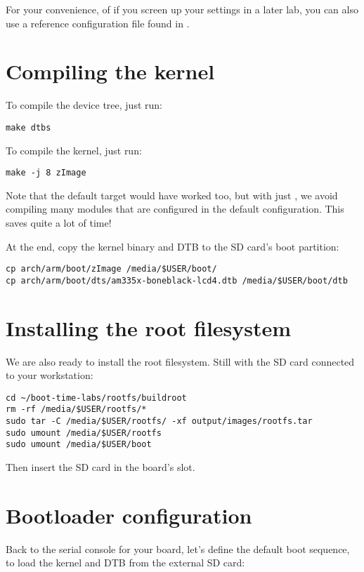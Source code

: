 For your convenience, of if you screen up your settings in a later lab,
you can also use a reference configuration file found in
.

\section{Compiling the kernel}

To compile the device tree, just run:
\begin{verbatim}
make dtbs
\end{verbatim}

To compile the kernel, just run:
\begin{verbatim}
make -j 8 zImage
\end{verbatim}

Note that the default  target would have worked too, but with
just , we avoid compiling many modules that are configured
in the default configuration. This saves quite a lot of time!

At the end, copy the kernel binary and DTB to the SD card's boot
partition:

\begin{verbatim}
cp arch/arm/boot/zImage /media/$USER/boot/
cp arch/arm/boot/dts/am335x-boneblack-lcd4.dtb /media/$USER/boot/dtb
\end{verbatim}

\section{Installing the root filesystem}

We are also ready to install the root filesystem. Still with the SD card
connected to your workstation:

\begin{verbatim}
cd ~/boot-time-labs/rootfs/buildroot
rm -rf /media/$USER/rootfs/*
sudo tar -C /media/$USER/rootfs/ -xf output/images/rootfs.tar
sudo umount /media/$USER/rootfs
sudo umount /media/$USER/boot
\end{verbatim}

Then insert the SD card in the board's slot.

\section{Bootloader configuration}

Back to the serial console for your board, let's define the default boot
sequence, to load the kernel and DTB from the external SD card:

